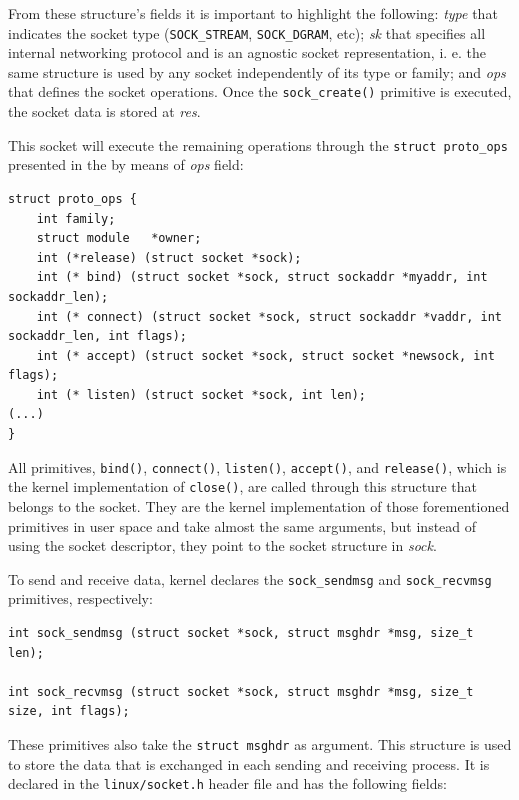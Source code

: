 From these structure's fields it is important to highlight the following: \textit{type} that indicates the socket type (\texttt{SOCK\_STREAM}, \texttt{SOCK\_DGRAM}, etc); \textit{sk} that specifies all internal networking protocol and is an agnostic socket representation, i. e. the same structure is used by any socket independently of its type or family; and \textit{ops} that defines the socket operations. Once the \texttt{sock\_create()} primitive is executed, the socket data is stored at \textit{res}.

This socket will execute the remaining operations through the \texttt{struct proto\_ops} presented in the  by means of \textit{ops} field:

\begin{lstlisting}[caption=Declaration of the \texttt{proto\_ops} structure]
struct proto_ops {
    int family;
    struct module   *owner;
    int (*release) (struct socket *sock);
    int (* bind) (struct socket *sock, struct sockaddr *myaddr, int sockaddr_len);
    int (* connect) (struct socket *sock, struct sockaddr *vaddr, int sockaddr_len, int flags);
    int (* accept) (struct socket *sock, struct socket *newsock, int flags);
    int (* listen) (struct socket *sock, int len);
(...)
}
\end{lstlisting}

All primitives, \texttt{bind()}, \texttt{connect()}, \texttt{listen()}, \texttt{accept()}, and \texttt{release()}, which is the kernel implementation of \texttt{close()}, are called through this structure that belongs to the socket. They are the kernel implementation of those forementioned primitives in user space and take almost the same arguments, but instead of using the socket descriptor, they point to the socket structure in \textit{sock}.

To send and receive data, kernel declares the \texttt{sock\_sendmsg} and \texttt{sock\_recvmsg} primitives, respectively:

\begin{lstlisting}[caption=Declaration of the \texttt{sock\_sendmsg()} and texttt{sock\_recvmsg}  functions]
int sock_sendmsg (struct socket *sock, struct msghdr *msg, size_t len);

int sock_recvmsg (struct socket *sock, struct msghdr *msg, size_t size, int flags);
\end{lstlisting}

These primitives also take the \texttt{struct msghdr} as argument. This structure is used to store the data that is exchanged in each sending and receiving process. It is declared in the \texttt{linux/socket.h} header file and has the following fields:

